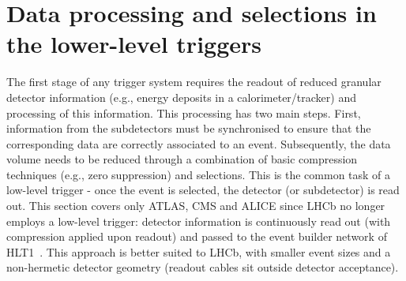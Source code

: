 \section{Data processing and selections in the lower-level triggers}
The first stage of any trigger system requires the readout of reduced granular detector information (e.g., energy deposits in a calorimeter/tracker) and processing of this information. 
This processing has two main steps. First, information from the subdetectors must be synchronised to ensure that the corresponding data are correctly associated to an event.  
Subsequently, the data volume needs to be reduced through a combination of basic compression techniques (e.g., zero suppression) and selections. 
This is the common task of a low-level trigger - once the event is selected, the detector (or subdetector) is read out. 
This section covers only ATLAS, CMS and ALICE since LHCb no longer employs a low-level trigger: detector information is continuously read out (with compression applied upon readout) and passed to the event builder network of HLT1~\cite{LHCb:2023hlw}.
This approach is better suited to LHCb, with smaller event sizes and a non-hermetic detector geometry (readout cables sit outside detector acceptance).


